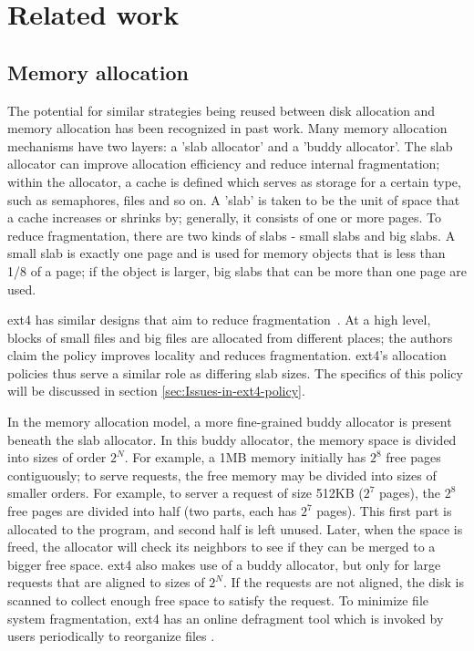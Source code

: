 \documentclass{acm_proc_article-sp}
\begin{document}
\section{Related work}
\label{sec:Related-work}
\subsection{Memory allocation}
The potential for similar strategies being reused between disk allocation and memory allocation has been recognized in past work.  Many memory allocation mechanisms have two layers: a 'slab allocator' and a 'buddy allocator'.  The slab allocator can improve allocation efficiency and reduce internal fragmentation; within the allocator, a cache is defined which serves as storage for a certain type, such as semaphores, files and so on.  A 'slab' is taken to be the unit of space that a cache increases or shrinks by; generally, it consists of one or more pages. To reduce fragmentation, there are two kinds of slabs - small slabs and big slabs.  A small slab is exactly one page and is used for memory objects that is less than 1/8 of a page; if the object is larger, big slabs that can be more than one page are used\cite{bonwick1994slab}.
 
ext4 has similar designs that aim to reduce fragmentation~\cite{cao2008ext4,linuxkernel}.  At a high level, blocks of small files and big files are allocated from different places; the authors claim the policy improves locality and reduces fragmentation. ext4's allocation policies thus serve a similar role as differing slab sizes.  The specifics of this policy will be discussed in section \ref{sec:Issues-in-ext4-policy}. 

In the memory allocation model, a more fine-grained buddy allocator
 is present beneath the slab allocator.  In this buddy allocator, 
 the memory space is divided into sizes of order $2^{N}$.  For example, 
 a 1MB memory initially has $2^{8}$ free pages contiguously; to serve 
 requests, the free memory may be divided into sizes of smaller orders. 
 For example, to server a request of size 512KB ($2^{7}$ pages), the $2^{8}$ 
 free pages are divided into half (two parts, each has $2^{7}$ pages). This 
 first part is allocated to the program, and second half is left unused. 
 Later, when the space is freed, the allocator will check its neighbors 
 to see if they can be merged to a bigger free space. ext4 also makes 
 use of a buddy allocator, but only for large requests that are aligned 
 to sizes of $2^{N}$. If the requests are not aligned, the disk is scanned 
 to collect enough free space to satisfy the request.  To minimize file 
 system fragmentation, ext4 has an online defragment tool which is 
 invoked by users periodically to reorganize files \cite{sato2007ext4}.
\end{document}
